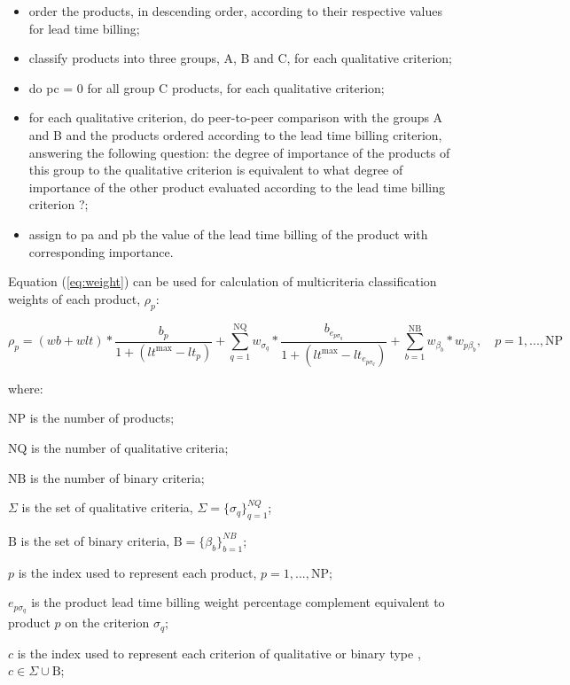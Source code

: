 \documentclass[10pt,fleqn,a4paper,twoside]{article}
\begin{document}
\begin{itemize}
\item order the products, in descending order, according to their respective values for lead time billing;
\item classify products into three groups, A, B and C, for each qualitative criterion;
\item do pc = 0 for all group C products, for each qualitative criterion;
\item for each qualitative criterion, do peer-to-peer comparison with the groups A and B and the products ordered according to the lead time billing criterion, answering the following question: the degree of importance of the products of this group to the qualitative criterion is equivalent to what degree of importance of the other product evaluated according to the lead time billing criterion ?;
\item assign to pa and pb the value of the lead time billing of the product with corresponding importance.
\end{itemize}	

Equation (\ref{eq:weight}) can be used for calculation of multicriteria classification weights of each product, $\rho_{p}$:

\begin{equation}
	\label{eq:weight}
	\rho_{p} = (wb + wlt) * \frac{b_p}{1 + (lt^{\max} - lt_p)} + \sum_{q=1}^{\textrm{NQ}}{w_{\sigma_q}*\frac{b_{e_{p\sigma_q}}}{1 + (lt^{\max} - lt_{e_{p\sigma_q}})}} + \sum_{b=1}^{\textrm{NB}}{w_{\beta_b}*w_{p\beta_b}}, \quad p= 1,...,\textrm{NP}
\end{equation}

where:

$\textrm{NP}$ is the number of products;

$\textrm{NQ}$ is the number of qualitative criteria;

$\textrm{NB}$ is the number of binary criteria;

$\Sigma$ is the set of qualitative criteria, \quad $\Sigma = \{\sigma_q\}_{q=1}^{NQ}$;

$\textrm{B}$ is the set of binary criteria, \quad $\textrm{B} = \{\beta_b\}_{b=1}^{NB}$;

$p$ is the index used to represent each product, \quad $p= 1,...,\textrm{NP}$;

$e_{p\sigma_q}$ is the product lead time billing weight percentage complement equivalent to product $p$ on the criterion $\sigma_q$;

$c$ is the index used to represent each criterion of qualitative or binary type , \quad $c \in \Sigma \cup \textrm{B}$;
 
\end{document}

